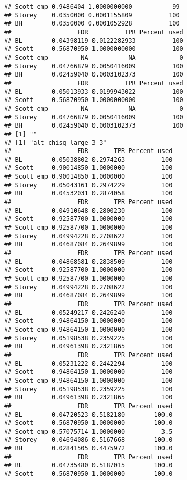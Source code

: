 \documentclass{article}\usepackage[]{graphicx}\usepackage[]{color}
\makeatletter
\newenvironment{kframe}{%
 \def\at@end@of@kframe{}%
 \ifinner\ifhmode%
  \def\at@end@of@kframe{\end{minipage}}%
  \begin{minipage}{\columnwidth}%
 \fi\fi%
 \def\FrameCommand##1{\hskip\@totalleftmargin \hskip-\fboxsep
 \colorbox{shadecolor}{##1}\hskip-\fboxsep
     \hskip-\linewidth \hskip-\@totalleftmargin \hskip\columnwidth}%
 \MakeFramed {\advance\hsize-\width
   \@totalleftmargin\z@ \linewidth\hsize
   \@setminipage}}%
 {\par\unskip\endMakeFramed%
 \at@end@of@kframe}
\newenvironment{knitrout}{}{} %
\makeatother
\begin{document}
\begin{knitrout}
\begin{kframe}
\begin{verbatim}
## Scott_emp 0.9486404 1.0000000000           99
## Storey    0.0350000 0.0001155809          100
## BH        0.0350000 0.0001052928          100
##                  FDR          TPR Percent used
## BL        0.04398119 0.0122282933          100
## Scott     0.56870950 1.0000000000          100
## Scott_emp         NA           NA            0
## Storey    0.04766879 0.0050416009          100
## BH        0.02459040 0.0003102373          100
##                  FDR          TPR Percent used
## BL        0.05013933 0.0199943022          100
## Scott     0.56870950 1.0000000000          100
## Scott_emp         NA           NA            0
## Storey    0.04766879 0.0050416009          100
## BH        0.02459040 0.0003102373          100
## [1] ""
## [1] "alt_chisq_large_3_3"
##                  FDR       TPR Percent used
## BL        0.05038802 0.2974263          100
## Scott     0.90014850 1.0000000          100
## Scott_emp 0.90014850 1.0000000          100
## Storey    0.05043161 0.2974229          100
## BH        0.04532031 0.2874058          100
##                  FDR       TPR Percent used
## BL        0.04910648 0.2800230          100
## Scott     0.92587700 1.0000000          100
## Scott_emp 0.92587700 1.0000000          100
## Storey    0.04994228 0.2708622          100
## BH        0.04687084 0.2649899          100
##                  FDR       TPR Percent used
## BL        0.04868581 0.2838509          100
## Scott     0.92587700 1.0000000          100
## Scott_emp 0.92587700 1.0000000          100
## Storey    0.04994228 0.2708622          100
## BH        0.04687084 0.2649899          100
##                  FDR       TPR Percent used
## BL        0.05249217 0.2426240          100
## Scott     0.94864150 1.0000000          100
## Scott_emp 0.94864150 1.0000000          100
## Storey    0.05198538 0.2359225          100
## BH        0.04961398 0.2321865          100
##                  FDR       TPR Percent used
## BL        0.05231222 0.2442294          100
## Scott     0.94864150 1.0000000          100
## Scott_emp 0.94864150 1.0000000          100
## Storey    0.05198538 0.2359225          100
## BH        0.04961398 0.2321865          100
##                  FDR       TPR Percent used
## BL        0.04720523 0.5182180        100.0
## Scott     0.56870950 1.0000000        100.0
## Scott_emp 0.57075714 1.0000000          3.5
## Storey    0.04694086 0.5167668        100.0
## BH        0.02841505 0.4475972        100.0
##                  FDR       TPR Percent used
## BL        0.04735480 0.5187015        100.0
## Scott     0.56870950 1.0000000        100.0

\end{verbatim}
\end{kframe}
\end{knitrout}
\end{document}
